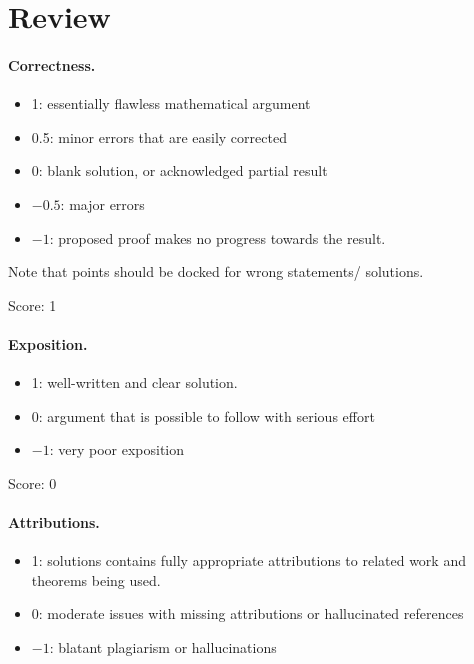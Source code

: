 \documentclass[11pt]{article}
\theoremstyle{definition}
\theoremstyle{remark}
\begin{document}
\maketitle

\section{Review}

\paragraph{Correctness.}
\begin{itemize}
	\item  1: essentially flawless mathematical argument
	\item  0.5: minor errors that are easily corrected
	\item  0: blank solution, or acknowledged partial result
	\item  $-0.5$: major errors
	\item  $-1$: proposed proof makes no progress towards the result.
\end{itemize}
Note that points should be docked for wrong statements/ solutions.  

\noindent Score: 1

\paragraph{Exposition.}
\begin{itemize}
	\item  1: well-written and clear solution.
	\item  0: argument that is possible to follow with serious effort
	\item  $-1$: very poor exposition
\end{itemize}

\noindent Score: 0

\paragraph{Attributions.}
\begin{itemize}
	\item  1: solutions contains fully appropriate attributions
		to related work and theorems being used.
	\item  0: moderate issues with missing attributions or hallucinated references
	\item  $-1$: blatant plagiarism or hallucinations
\end{itemize}
\end{document}
